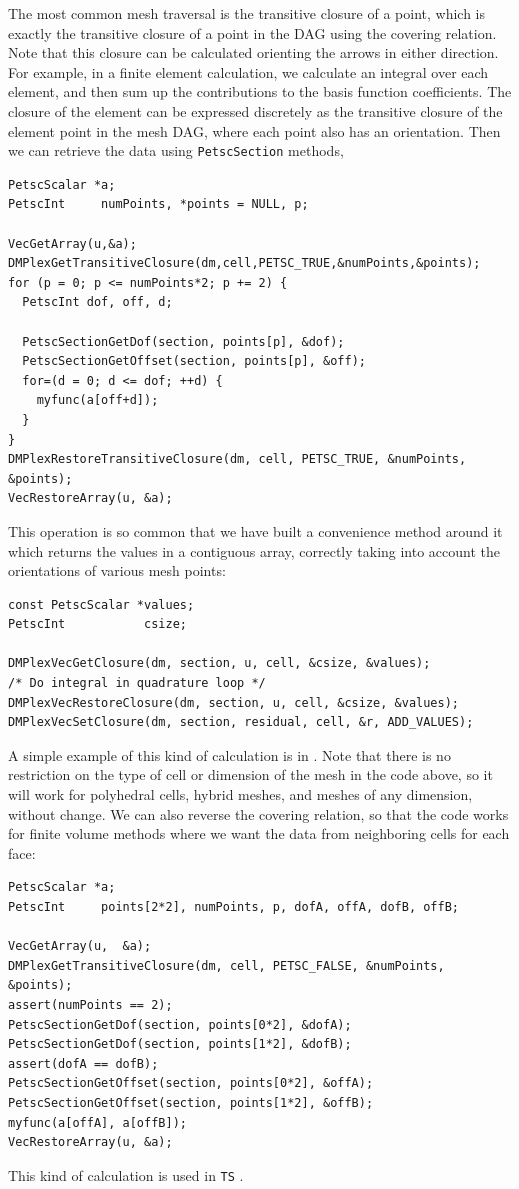 The most common mesh traversal is the transitive closure of a point, which is exactly the transitive closure of a point
in the DAG using the covering relation. Note that this closure can be calculated orienting the arrows in either
direction. For example, in a finite element calculation, we calculate an integral over each element, and
then sum up the contributions to the basis function coefficients. The closure of the element can be expressed discretely
as the transitive closure of the element point in the mesh DAG, where each point also has an orientation. Then we can
retrieve the data using \lstinline{PetscSection} methods,
\begin{lstlisting}
PetscScalar *a;
PetscInt     numPoints, *points = NULL, p;

VecGetArray(u,&a);
DMPlexGetTransitiveClosure(dm,cell,PETSC_TRUE,&numPoints,&points);
for (p = 0; p <= numPoints*2; p += 2) {
  PetscInt dof, off, d;

  PetscSectionGetDof(section, points[p], &dof);
  PetscSectionGetOffset(section, points[p], &off);
  for=(d = 0; d <= dof; ++d) {
    myfunc(a[off+d]);
  }
}
DMPlexRestoreTransitiveClosure(dm, cell, PETSC_TRUE, &numPoints, &points);
VecRestoreArray(u, &a);
\end{lstlisting}
This operation is so common that we have built a convenience method around it which returns the values in a contiguous
array, correctly taking into account the orientations of various mesh points:
\begin{lstlisting}
const PetscScalar *values;
PetscInt           csize;

DMPlexVecGetClosure(dm, section, u, cell, &csize, &values);
/* Do integral in quadrature loop */
DMPlexVecRestoreClosure(dm, section, u, cell, &csize, &values);
DMPlexVecSetClosure(dm, section, residual, cell, &r, ADD_VALUES);
\end{lstlisting}
A simple example of this kind of calculation is in \href{http://www.mcs.anl.gov/petsc/petsc-current/src/dm/impls/plex/plexfem.c.html#DMComputeL2Diff_Plex}{}. Note that there is no restriction on the
type of cell or dimension of the mesh in the code above, so it will work for polyhedral cells, hybrid meshes, and meshes
of any dimension, without change. We can also reverse the covering relation, so that the code works for finite volume
methods where we want the data from neighboring cells for each face:
\begin{lstlisting}
PetscScalar *a;
PetscInt     points[2*2], numPoints, p, dofA, offA, dofB, offB;

VecGetArray(u,  &a);
DMPlexGetTransitiveClosure(dm, cell, PETSC_FALSE, &numPoints, &points);
assert(numPoints == 2);
PetscSectionGetDof(section, points[0*2], &dofA);
PetscSectionGetDof(section, points[1*2], &dofB);
assert(dofA == dofB);
PetscSectionGetOffset(section, points[0*2], &offA);
PetscSectionGetOffset(section, points[1*2], &offB);
myfunc(a[offA], a[offB]);
VecRestoreArray(u, &a);
\end{lstlisting}
This kind of calculation is used in \lstinline{TS} \href{http://www.mcs.anl.gov/petsc/petsc-current/src/ts/examples/tutorials/ex11.c.html}{}.

